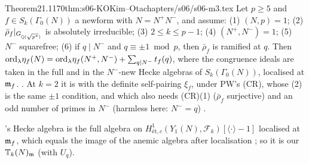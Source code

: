 \begin{quoted}{Theorem}{21.1}{170}{thm:s06-KO}{Kim--Ota}{chapters/s06/s06-m3.tex}\label{rpt:thm:s06-KO}
Let $p\ge5$ and $f\in S_k(\Gamma_0(N))$ a newform with $N=N^+N^-$, and assume: (1) $(N,p)=1$; (2) $\bar\rho_f|_{G_{\mathbb{Q}(\sqrt{p^*})}}$
is absolutely irreducible; (3) $2\le k\le p-1$; (4) $(N^+,N^-)=1$; (5) $N^-$ squarefree; (6) if $q\mid N^-$ and $q\equiv\pm1\bmod p$,
then $\bar\rho_f$ is ramified at $q$. Then $\mathrm{ord}_\lambda\eta_f(N)=\mathrm{ord}_\lambda\eta_f(N^+,N^-)+\sum_{q\mid N^-}t_f(q)$, where the
congruence ideals are taken in the full and in the $N^-$-new Hecke algebras of $S_k(\Gamma_0(N))$, localised at $\mathfrak{m}_f$.
\stcited{} \cite[Thm~1.1]{KO}
\cite[Thm 1.1, p.~1;
Def.~2.11 ($N^-$-new congruence ideal), p.~6]{KO}. At $k=2$ it is \cite[Thm~6.8]{PW}
\cite[Thm 6.8, p.~21]{PW} with the definite self-pairing
$\xi_f$, under PW's (CR), whose (2) is the same $\pm1$ condition, and which also needs (CR)(1) ($\bar\rho_f$ surjective) and an odd number of primes in $N^-$ (harmless here: $N^-=q$) \cite[(CR), p.~2]{PW}.
\end{quoted}
\noindent \cite{KO}'s Hecke algebra is the full algebra on $H^1_{\text{ét},c}(Y_1(N),\mathcal F_k)[\langle\cdot\rangle-1]$ localised at $\mathfrak{m}_f$,
which equals the image of the anemic algebra after localisation \cite[\S2.1.3, p.~5]{KO}; so it is our $\mathbb{T}_k(N)_{\mathfrak{m}}$ (with $U_q$).

